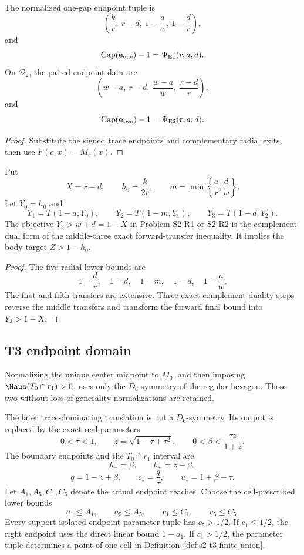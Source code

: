\begin{proposition}
\label{prop:s2-endpoint-bridge}
The normalized one-gap endpoint tuple is
\[
 \left(\frac{k}{r},\ r-d,\ 1-\frac a w,\ 1-\frac d r\right),
\]
and
\[
 \mathrm{Cap}(\mathbf e_{\rm one})-1
 =\Psi_{\rm E1}(r,a,d).
\]
On \(\mathcal D_2\), the paired endpoint data are
\[
 \left(w-a,\ r-d,\ \frac{w-a}{w},\ \frac{r-d}{r}\right),
\]
and
\[
 \mathrm{Cap}(\mathbf e_{\rm two})-1
 =\Psi_{\rm E2}(r,a,d).
\]
\end{proposition}

\begin{proof}
Substitute the signed trace endpoints and complementary radial exits, then use
\(F(c,x)=M_c(x)\).
\end{proof}

\begin{proposition}
\label{prop:s2-return-bridge}
Put
\[
 X=r-d,\qquad h_0=\frac{k}{2r},\qquad
 m=\min\left\{\frac ar,\frac dw\right\}.
\]
Let \(Y_0=h_0\) and
\[
 Y_1=T(1-a,Y_0),\qquad
 Y_2=T(1-m,Y_1),\qquad
 Y_3=T(1-d,Y_2).
\]
The objective \(Y_3>w+d=1-X\) in Problem S2-R1 or S2-R2 is the
complement-dual form of the middle-three exact forward-transfer inequality.
It implies the body target \(Z>1-h_0\).
\end{proposition}

\begin{proof}
The five radial lower bounds are
\[
 1-\frac dr,\quad 1-d,\quad 1-m,\quad 1-a,\quad 1-\frac aw.
\]
The first and fifth transfers are extensive.  Three exact complement-duality
steps reverse the middle transfers and transform the forward final bound
into \(Y_3>1-X\).
\end{proof}

\subsection{T3 endpoint domain}

\begin{proposition}
\label{prop:s2-t3-source-bridge}
Normalizing the unique center midpoint to \(M_0\), and then imposing
\(\Haus(T_0\cap r_1)>0\), uses only the \(D_6\)-symmetry of the regular
hexagon.  Those two without-loss-of-generality normalizations are retained.

The later trace-dominating translation is not a \(D_6\)-symmetry.  Its output
is replaced by the exact real parameters
\[
 0<\tau<1,\qquad
 z=\sqrt{1-\tau+\tau^2},\qquad
 0<\beta<\frac{\tau z}{1+z}.
\]
The boundary endpoints and the $T_0\cap r_1$ interval are
\[
 b_-=\beta,\qquad b_+=z-\beta,
\]
\[
q=1-z+\beta,\qquad
c_\star=\frac q\tau,\qquad
u_\star=1+\beta-\tau.
\]
Let $A_1,A_5,C_1,C_5$ denote the actual endpoint reaches.  Choose the
cell-prescribed lower bounds
\[
 a_1\le A_1,\qquad a_5\le A_5,\qquad
 c_1\le C_1,\qquad c_5\le C_5.
\]
Every support-isolated endpoint parameter tuple has $c_5>1/2$.  If
$c_1\le1/2$, the right endpoint uses the direct linear bound $1-a_1$.  If
$c_1>1/2$, the parameter tuple determines a point of one cell in
Definition~\ref{def:s2-t3-finite-union}.
\end{proposition}

